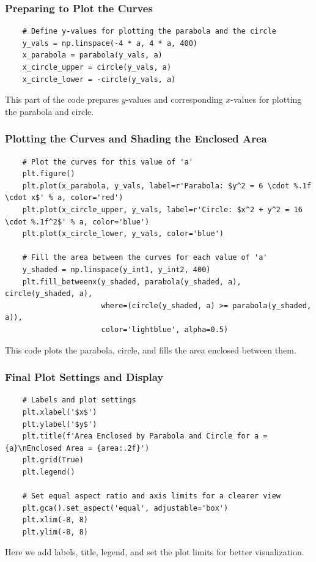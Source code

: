 \documentclass{beamer}
\begin{document}
\begin{frame}[fragile]
    \frametitle{Preparing to Plot the Curves}

    \begin{lstlisting}
    # Define y-values for plotting the parabola and the circle
    y_vals = np.linspace(-4 * a, 4 * a, 400)
    x_parabola = parabola(y_vals, a)
    x_circle_upper = circle(y_vals, a)
    x_circle_lower = -circle(y_vals, a)
    \end{lstlisting}

    This part of the code prepares \( y \)-values and corresponding \( x \)-values for plotting the parabola and circle.
\end{frame}

\begin{frame}[fragile]
    \frametitle{Plotting the Curves and Shading the Enclosed Area}

    \begin{lstlisting}
    # Plot the curves for this value of 'a'
    plt.figure()
    plt.plot(x_parabola, y_vals, label=r'Parabola: $y^2 = 6 \cdot %.1f \cdot x$' % a, color='red')
    plt.plot(x_circle_upper, y_vals, label=r'Circle: $x^2 + y^2 = 16 \cdot %.1f^2$' % a, color='blue')
    plt.plot(x_circle_lower, y_vals, color='blue')

    # Fill the area between the curves for each value of 'a'
    y_shaded = np.linspace(y_int1, y_int2, 400)
    plt.fill_betweenx(y_shaded, parabola(y_shaded, a), circle(y_shaded, a), 
                      where=(circle(y_shaded, a) >= parabola(y_shaded, a)),
                      color='lightblue', alpha=0.5)
    \end{lstlisting}

    This code plots the parabola, circle, and fills the area enclosed between them.
\end{frame}

\begin{frame}[fragile]
    \frametitle{Final Plot Settings and Display}

    \begin{lstlisting}
    # Labels and plot settings
    plt.xlabel('$x$')
    plt.ylabel('$y$')
    plt.title(f'Area Enclosed by Parabola and Circle for a = {a}\nEnclosed Area = {area:.2f}')
    plt.grid(True)
    plt.legend()

    # Set equal aspect ratio and axis limits for a clearer view
    plt.gca().set_aspect('equal', adjustable='box')
    plt.xlim(-8, 8)
    plt.ylim(-8, 8)
    \end{lstlisting}

    Here we add labels, title, legend, and set the plot limits for better visualization.
\end{frame}
\end{document}

